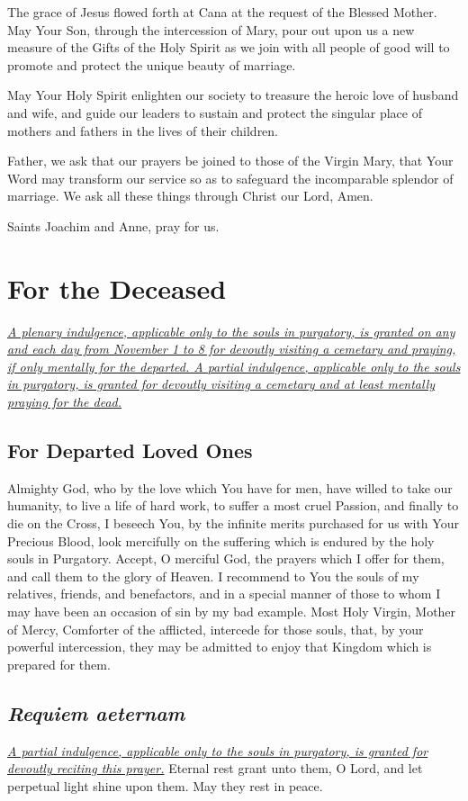 \documentclass[12pt]{article}
\newcommand{\prayersection}[1]{\section{#1}}
\newcommand{\prayertitle}[1]{\subsection{#1}}
\newcommand{\foreign}[1]{\textsl{#1}}
\newcommand{\note}[1]{{\small{\textsl{#1}}}\newline}
\newcommand{\linkednote}[2]{\hyperlink{#1}{\note{#2}}}
\begin{document}
The grace of Jesus flowed forth at Cana at the request of the Blessed Mother.
May Your Son, through the intercession of Mary, pour out upon us a new measure of the Gifts of the Holy Spirit as we join with all people of good will to promote and protect the unique beauty of marriage.

May Your Holy Spirit enlighten our society to treasure the heroic love of husband and wife, and guide our leaders to sustain and protect
the singular place of mothers and fathers in the lives of their children.

Father, we ask that our prayers be joined to those of the Virgin Mary, that Your Word may transform our service so as to safeguard the incomparable splendor of marriage.
We ask all these things through Christ our Lord,
Amen.

Saints Joachim and Anne, pray for us.

\newpage

\prayersection{For the Deceased}
\linkednote{grant29}{A plenary indulgence, applicable only to the souls in purgatory, is granted on any and each day from November 1 to 8 for devoutly visiting a cemetary and praying, if only mentally for the departed.
A partial indulgence, applicable only to the souls in purgatory, is granted for devoutly visiting a cemetary and at least mentally praying for the dead.}
\prayertitle{For Departed Loved Ones}
Almighty God, who by the love which You have for men, have willed to take our humanity, to live a life of hard work, to suffer a most cruel Passion, and finally to die on the Cross, I beseech You, by the infinite merits purchased for us with Your Precious Blood, look mercifully on the suffering  which is endured by the holy souls in Purgatory. 
Accept, O merciful God, the prayers which I offer for them, and call them to the glory of Heaven. 
I recommend to You the souls of my relatives, friends, and benefactors, and in a special manner of those to whom I may have been an occasion of sin by my bad example. 
Most Holy Virgin, Mother of Mercy, Comforter of the afflicted, intercede for those souls, that, by your powerful intercession, they may be admitted to enjoy that Kingdom which is prepared for them.

\prayertitle{\foreign{Requiem aeternam}}
\linkednote{grant29}{A partial indulgence, applicable only to the souls in purgatory, is granted for devoutly reciting this prayer.}
Eternal rest grant unto them, O Lord, and let perpetual light shine upon them.
May they rest in peace.
\end{document}
